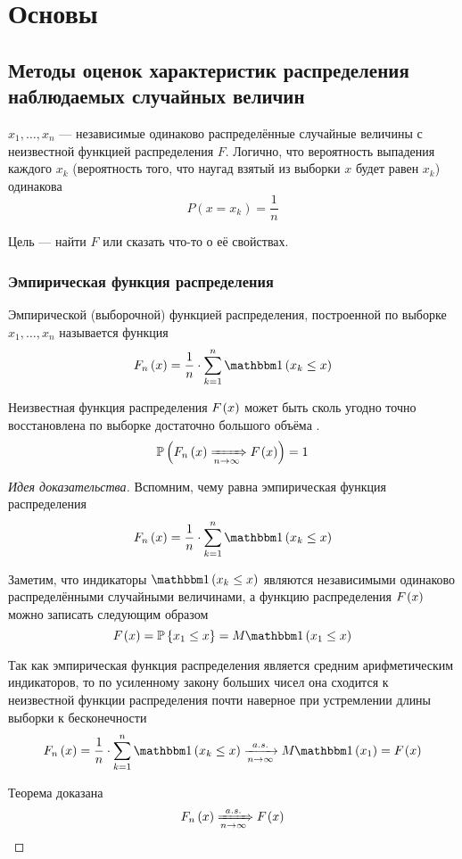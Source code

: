 \chapter{Основы}
\section{Методы оценок характеристик распределения
    наблюдаемых случайных величин}
$x_1, \dots, x_n$ --- независимые одинаково распределённые случайные величины
с неизвестной функцией распределения $F$.
Логично, что вероятность выпадения каждого $x_k$
(вероятность того, что наугад взятый из выборки $x$ будет равен $x_k$)
одинакова
$$P(x=x_k)=\frac{1}{n}$$

Цель --- найти $F$ или сказать что-то о её свойствах.

\subsection{Эмпирическая функция распределения}
\begin{definition}
    Эмпирической (выборочной) функцией распределения,
    построенной по выборке $x_1, \dots, x_n$ называется функция
    $$\cdfn{x}=\frac{1}{n}\cdot \sum_{k=1}^n
    \indicator{x_k\le x}$$
\end{definition}

\begin{theorem}Неизвестная функция распределения $F_{}\left(x\right)$
    может быть сколь угодно точно
    восстановлена по выборке достаточно большого объёма
    \cite[стр.~25]{BorovkovMS}.
    $$\mathbb{P}\left( F_n\left(x\right)\xRightarrow[n\to\infty]{} F_{}\left(x\right) \right)=1$$
\end{theorem}
\begin{proof}[Идея доказательства]
Вспомним, чему равна эмпирическая функция распределения
$$\cdfn{x}=\frac{1}{n}\cdot \sum_{k=1}^n
\indicator{x_k\le x}$$

Заметим, что индикаторы $\indicator{x_k\le x}$
являются независимыми одинаково распределёнными случайными величинами,
а функцию распределения $F_{}\left(x\right)$ можно записать следующим образом
$$\cdf{x}=\Probability{x_1\le x}=\mean{\indicator{x_1\le x}}$$

Так как эмпирическая функция распределения является
средним арифметическим индикаторов, то по усиленному закону больших чисел
она сходится к неизвестной функции распределения почти наверное
при устремлении длины выборки к бесконечности
$$\cdfn{x}=\frac{1}{n}\cdot\sum_{k=1}^n\indicator{x_k\le x}
\acovergence\mean{\indicator{x_1}}=\cdf{x}$$

Теорема доказана
$$F_n\left(x\right)\xRightarrow[n\to\infty]{a.s.}F_{}\left(x\right)$$
\end{proof}

